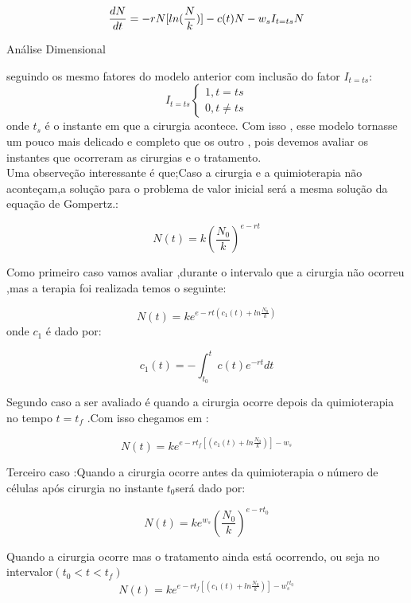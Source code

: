  
\begin{equation}
  \frac{dN}{dt} =-rN[ln(\frac{N}{k})]- c(t)N-w_sI_{t=ts}N\\
\end{equation}

Análise Dimensional

seguindo os mesmo fatores do modelo anterior com  inclusão do fator $I_{t=ts}$:
 \begin{equation*}I_{t=ts}
\begin{cases} 
  1 ,  t=ts\\
  0 ,    t\neq ts 
\end{cases}
\end{equation*}
onde $t_s$ é o instante em que a cirurgia acontece.
Com isso , esse modelo tornasse um pouco mais delicado e completo que os outro , pois devemos avaliar os instantes que ocorreram as cirurgias e o tratamento.
\\
Uma observeção interessante é que;Caso a cirurgia e a quimioterapia não aconteçam,a solução para o problema de valor inicial será a mesma solução da equação de Gompertz.:

\begin{equation*}
N(t)=k(\frac{N_0}{k})^{e-rt} 
\end{equation*}

Como primeiro caso vamos avaliar ,durante o intervalo que a cirurgia não ocorreu ,mas a terapia foi realizada temos o seguinte:

\begin{equation*}
N(t)=ke^{e-rt(c_1(t)+ln\frac{N_0}{k})}
\end{equation*}
onde $c_1$ é dado por:

\begin{equation*}
 c_1(t)=-\int_{t_0}^{t}c(t)e^{-rt}dt
\end{equation*}

Segundo caso a ser avaliado é quando a  cirurgia  ocorre depois da quimioterapia no tempo $t=t_f$ .Com isso chegamos em :

\begin{equation*}
   N(t)=ke^{e-rt_f[(c_1(t)+ln\frac{N_0}{k})]-w_s}
\end{equation*}

Terceiro caso :Quando a cirurgia ocorre antes da quimioterapia
 o número de células após cirurgia no instante $t_0$será dado por:

 \begin{equation*}
   N(t)=ke^{w_s}(\frac{N_0}{k})^{e-rt_0}
\end{equation*}

 Quando a cirurgia ocorre mas o tratamento ainda está ocorrendo, ou seja no intervalor$(t_0<t<t_f)$
\begin{equation*}
    N(t)=ke^{e-rt_f[(c_1(t)+ln\frac{N_0}{k})]-w_s^{rt_0}}   
\end{equation*}

